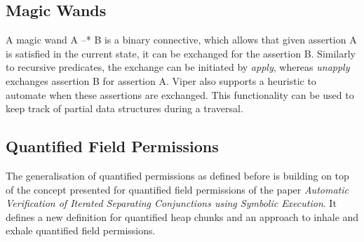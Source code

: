 \documentclass[12pt]{article}
\begin{document}





\subsection{Magic Wands}
A magic wand\cite{magicwand} A --* B is a binary connective, which allows that given assertion A is satisfied in the current state, it can be exchanged for the assertion B. Similarly to recursive predicates, the exchange can be initiated by \textit{apply}, whereas \textit{unapply} exchanges assertion B for assertion A. Viper also supports a heuristic to automate when these assertions are exchanged. This functionality can be used to keep track of partial data structures during a traversal.


\subsection{Quantified Field Permissions}
The generalisation of quantified permissions as defined before is building on top of the concept presented for quantified field permissions of the paper \textit{Automatic Verification of Iterated Separating Conjunctions using Symbolic Execution}\cite{isc}.
It defines a new definition for quantified heap chunks and an approach to inhale and exhale quantified field permissions.

\end{document}
